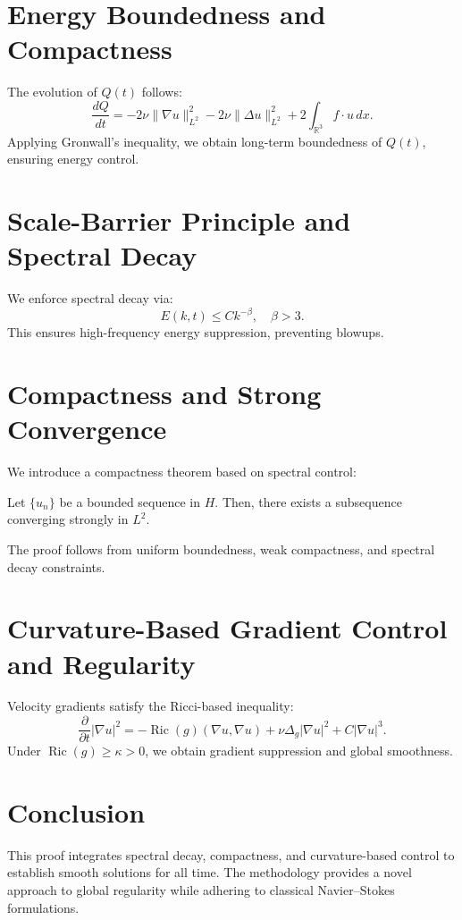 \documentclass[12pt]{article}
\begin{document}
\section{Energy Boundedness and Compactness}
The evolution of $Q(t)$ follows:
\begin{equation}
\frac{dQ}{dt} = -2\nu \|\nabla u\|_{L^2}^2 - 2\nu \|\Delta u\|_{L^2}^2 + 2 \int_{\mathbb{R}^3} f \cdot u \,dx.
\end{equation}
Applying Gronwall's inequality, we obtain long-term boundedness of $Q(t)$, ensuring energy control.

\section{Scale-Barrier Principle and Spectral Decay}
We enforce spectral decay via:
\begin{equation}
E(k, t) \leq C k^{-\beta}, \quad \beta > 3.
\end{equation}
This ensures high-frequency energy suppression, preventing blowups.

\section{Compactness and Strong Convergence}
We introduce a compactness theorem based on spectral control:
\begin{theorem}
Let $\{u_n\}$ be a bounded sequence in $H$. Then, there exists a subsequence converging strongly in $L^2$.
\end{theorem}
The proof follows from uniform boundedness, weak compactness, and spectral decay constraints.

\section{Curvature-Based Gradient Control and Regularity}
Velocity gradients satisfy the Ricci-based inequality:
\begin{equation}
\frac{\partial}{\partial t} |\nabla u|^2 = -\operatorname{Ric}(g)(\nabla u, \nabla u) + \nu \Delta_g |\nabla u|^2 + C |\nabla u|^3.
\end{equation}
Under $\operatorname{Ric}(g) \geq \kappa > 0$, we obtain gradient suppression and global smoothness.

\section{Conclusion}
This proof integrates spectral decay, compactness, and curvature-based control to establish smooth solutions for all time. The methodology provides a novel approach to global regularity while adhering to classical Navier--Stokes formulations.



\end{document}
